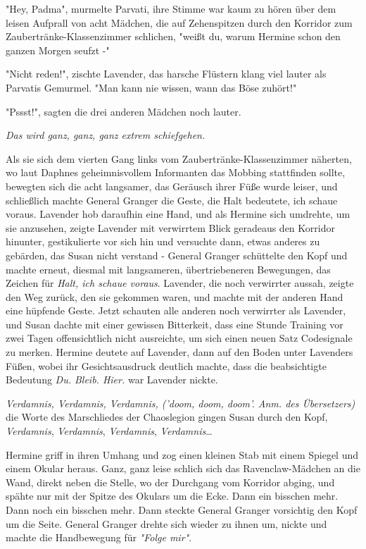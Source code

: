{"Hey, Padma", murmelte Parvati, ihre Stimme war kaum zu hören über dem leisen Aufprall von acht Mädchen, die auf Zehenspitzen durch den Korridor zum Zaubertränke-Klassenzimmer schlichen, "weißt du, warum Hermine schon den ganzen Morgen seufzt -"

"Nicht reden!", zischte Lavender, das harsche Flüstern klang viel lauter als Parvatis Gemurmel. "Man kann nie wissen, wann das Böse zuhört!"

"Pssst!", sagten die drei anderen Mädchen noch lauter.

\emph{Das wird ganz, ganz, ganz extrem schiefgehen.}

Als sie sich dem vierten Gang links vom Zaubertränke-Klassenzimmer näherten, wo laut Daphnes geheimnisvollem Informanten das Mobbing stattfinden sollte, bewegten sich die acht langsamer, das Geräusch ihrer Füße wurde leiser, und schließlich machte General Granger die Geste, die Halt bedeutete, ich schaue voraus. Lavender hob daraufhin eine Hand, und als Hermine sich umdrehte, um sie anzusehen, zeigte Lavender mit verwirrtem Blick geradeaus den Korridor hinunter, gestikulierte vor sich hin und versuchte dann, etwas anderes zu gebärden, das Susan nicht verstand - General Granger schüttelte den Kopf und machte erneut, diesmal mit langsameren, übertriebeneren Bewegungen, das Zeichen für \emph{Halt, ich schaue voraus}. Lavender, die noch verwirrter aussah, zeigte den Weg zurück, den sie gekommen waren, und machte mit der anderen Hand eine hüpfende Geste. Jetzt schauten alle anderen noch verwirrter als Lavender, und Susan dachte mit einer gewissen Bitterkeit, dass eine Stunde Training vor zwei Tagen offensichtlich nicht ausreichte, um sich einen neuen Satz Codesignale zu merken. Hermine deutete auf Lavender, dann auf den Boden unter Lavenders Füßen, wobei ihr Gesichtsausdruck deutlich machte, dass die beabsichtigte Bedeutung \emph{Du. Bleib. Hier.} war Lavender nickte.

\emph{Verdamnis, Verdamnis, Verdamnis, ('doom, doom, doom'. Anm. des Übersetzers)} die Worte des Marschliedes der Chaoslegion gingen Susan durch den Kopf, \emph{Verdamnis}, \emph{Verdamnis}, \emph{Verdamnis}, \emph{Verdamnis}…

Hermine griff in ihren Umhang und zog einen kleinen Stab mit einem Spiegel und einem Okular heraus. Ganz, ganz leise schlich sich das Ravenclaw-Mädchen an die Wand, direkt neben die Stelle, wo der Durchgang vom Korridor abging, und spähte nur mit der Spitze des Okulars um die Ecke. Dann ein bisschen mehr. Dann noch ein bisschen mehr. Dann steckte General Granger vorsichtig den Kopf um die Seite. General Granger drehte sich wieder zu ihnen um, nickte und machte die Handbewegung für \emph{"Folge mir"}.

}
